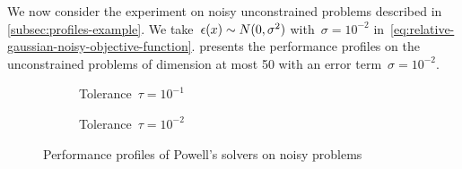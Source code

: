 We now consider the experiment on noisy unconstrained problems described in \cref{subsec:profiles-example}.
We take~$\epsilon(\iter) \sim N(0, \sigma^2)$ with~$\sigma = 10^{-2}$ in~\cref{eq:relative-gaussian-noisy-objective-function}.
 presents the performance profiles on the unconstrained problems of dimension at most \num{50} with an error term~$\sigma = 10^{-2}$.

\begin{figure}[ht]
    \centering
    \begin{subfigure}[b]{0.49\textwidth}
        \centering
        \caption{Tolerance~$\tau = 10^{-1}$}
    \end{subfigure}
    \hfill
    \begin{subfigure}[b]{0.49\textwidth}
        \centering
        \caption{Tolerance~$\tau = 10^{-2}$}
    \end{subfigure}
    \caption{Performance profiles of Powell's  solvers on noisy problems}
    \label{fig:ppun-50}
\end{figure}

